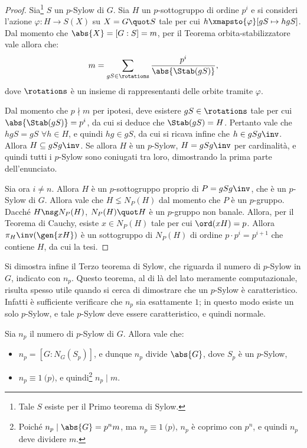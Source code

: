 \documentclass[12pt]{scrartcl}
\begin{document}
	\begin{proof}
		Sia\footnote{
			Tale $S$ esiste per il Primo teorema di Sylow.
		} $S$ un $p$-Sylow di $G$. Sia $H$ un $p$-sottogruppo
		di ordine $p^i$ e si consideri l'azione
		$\varphi : H \to S(X)$ su $X = G \quot S$ tale per
		cui $h \xmapsto{\varphi} [gS \mapsto hgS]$. Dal momento
		che $\abs{X} = [G : S] = m$, per
		il Teorema orbita-stabilizzatore vale allora che:
		\[ m = \sum_{gS \in \rotations} \frac{p^i}{\abs{\Stab(gS)}}, \]
		dove $\rotations$ è un insieme di rappresentanti delle
		orbite tramite $\varphi$. \medskip
		
		
		Dal momento che $p \nmid m$ per ipotesi, deve esistere
		$gS \in \rotations$ tale per cui $\abs{\Stab(gS)} = p^i$,
		da cui si deduce che $\Stab(gS) = H$. Pertanto vale che
		$hgS = gS$ $\forall h \in H$, e quindi
		$hg \in gS$, da cui si ricava infine che $h \in gSg\inv$.
		Allora $H \subseteq gSg\inv$. Se allora $H$ è un $p$-Sylow,
		$H = gSg\inv$ per cardinalità, e quindi tutti i
		$p$-Sylow sono coniugati tra loro, dimostrando la prima
		parte dell'enunciato. \medskip
		
		
		Sia ora $i \neq n$. Allora $H$ è un $p$-sottogruppo proprio
		di $P = gSg\inv$, che è un $p$-Sylow di $G$. Allora
		vale che $H \lneq N_P(H)$ dal momento che $P$ è un $p$-gruppo.
		Dacché $H \nsg N_P(H)$, $N_P(H) \quot H$ è un $p$-gruppo
		non banale. Allora, per il Teorema di Cauchy, esiste
		$x \in N_P(H)$ tale per cui $\ord(xH) = p$. Allora
		$\pi_H\inv(\gen{xH})$ è un sottogruppo di $N_P(H)$ di ordine
		$p \cdot p^i = p^{i+1}$ che contiene $H$, da cui
		la tesi.
	\end{proof} \bigskip
	
	
	Si dimostra infine il Terzo teorema di Sylow, che riguarda
	il numero di $p$-Sylow in $G$, indicato con $n_p$. Questo
	teorema, al di là del lato meramente computazionale, risulta
	spesso utile quando si cerca di dimostrare che un $p$-Sylow
	è caratteristico. Infatti è sufficiente verificare che
	$n_p$ sia esattamente $1$; in questo modo esiste un solo
	$p$-Sylow, e tale $p$-Sylow deve essere caratteristico, e
	quindi normale.
	
	\begin{theorem}
		Sia $n_p$ il numero di $p$-Sylow di $G$. Allora vale
		che:
		
		\begin{itemize}
			\item $n_p = [G : N_G(S_p)]$, e dunque $n_p$ divide $\abs{G}$, dove
				$S_p$ è un $p$-Sylow,
			\item $n_p \equiv 1 \pod p$, e quindi\footnote{
				Poiché $n_p \mid \abs{G} = p^n m$, ma $n_p \equiv 1 \pod p$, $n_p$ è coprimo con $p^n$, e quindi
				$n_p$ deve dividere $m$.
			} $n_p \mid m$.
		\end{itemize}
	\end{theorem}
	
\end{document}
